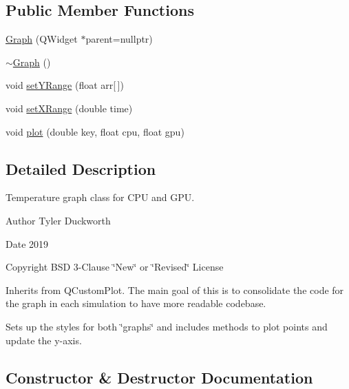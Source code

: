 \subsection*{Public Member Functions}
\begin{DoxyCompactItemize}
\item 
\mbox{\hyperlink{classGraph_a300165322c32ba400d3ad41a0a3628be}{Graph}} (Q\+Widget $\ast$parent=nullptr)
\item 
\mbox{\hyperlink{classGraph_a902c5b3eacb66d60752525ab23297a95}{$\sim$\+Graph}} ()
\item 
void \mbox{\hyperlink{classGraph_afdcfe2e0de63e5426fc20599304f7e8b}{set\+Y\+Range}} (float arr\mbox{[}$\,$\mbox{]})
\item 
void \mbox{\hyperlink{classGraph_a97336e2519fa9d0482a3f6cd604d9f72}{set\+X\+Range}} (double time)
\item 
void \mbox{\hyperlink{classGraph_ae5b5a135d83ce82c768e4e337ddfb520}{plot}} (double key, float cpu, float gpu)
\end{DoxyCompactItemize}


\subsection{Detailed Description}
Temperature graph class for C\+PU and G\+PU. 

\begin{DoxyAuthor}{Author}
Tyler Duckworth 
\end{DoxyAuthor}
\begin{DoxyDate}{Date}
2019 
\end{DoxyDate}
\begin{DoxyCopyright}{Copyright}
B\+SD 3-\/Clause \char`\"{}\+New\char`\"{} or \char`\"{}\+Revised\char`\"{} License
\end{DoxyCopyright}
Inherits from Q\+Custom\+Plot. The main goal of this is to consolidate the code for the graph in each simulation to have more readable codebase.

Sets up the styles for both \char`\"{}graphs\char`\"{} and includes methods to plot points and update the y-\/axis. 

\subsection{Constructor \& Destructor Documentation}
\mbox{\label{classGraph_a300165322c32ba400d3ad41a0a3628be}} 
